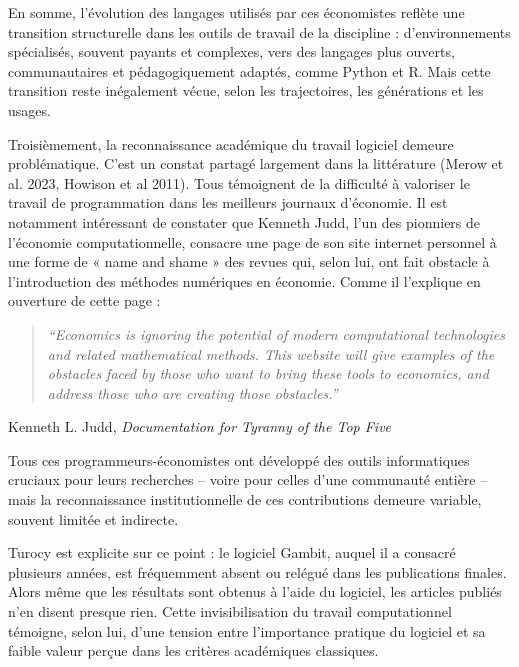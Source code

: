 En somme, l’évolution des langages utilisés par ces économistes reflète une transition structurelle dans les outils de travail de la discipline : d’environnements spécialisés, souvent payants et complexes, vers des langages plus ouverts, communautaires et pédagogiquement adaptés, comme Python et R. Mais cette transition reste inégalement vécue, selon les trajectoires, les générations et les usages.


Troisièmement, la reconnaissance académique du travail logiciel demeure problématique. C'est un constat partagé largement dans la littérature (Merow et al. 2023\cite{merowBetterIncentivesAre2023}, Howison et al 2011\cite{howisonScientificSoftwareProduction2011}). Tous témoignent de la difficulté à valoriser le travail de programmation dans les meilleurs journaux d'économie. Il est notamment intéressant de constater que Kenneth Judd, l’un des pionniers de l’économie computationnelle, consacre une page de son site internet personnel à une forme de « name and shame » des revues qui, selon lui, ont fait obstacle à l’introduction des méthodes numériques en économie\cite{DocumentationTyrannyTop}. Comme il l’explique en ouverture de cette page :
\begin{quote}
\begin{center}
\textit{``Economics is ignoring the potential of modern computational technologies and related mathematical methods. This website will give examples of the obstacles faced by those who want to bring these tools to economics, and address those who are creating those obstacles.''}
\end{center}
\end{quote} \hfill Kenneth L. Judd, \textit{Documentation for Tyranny of the Top Five}\cite{DocumentationTyrannyTop}

Tous ces programmeurs-économistes ont développé des outils informatiques cruciaux pour leurs recherches – voire pour celles d’une communauté entière – mais la reconnaissance institutionnelle de ces contributions demeure variable, souvent limitée et indirecte. 

Turocy est explicite sur ce point : le logiciel Gambit, auquel il a consacré plusieurs années, est fréquemment absent ou relégué dans les publications finales. Alors même que les résultats sont obtenus à l’aide du logiciel, les articles publiés n’en disent presque rien. Cette invisibilisation du travail computationnel témoigne, selon lui, d’une tension entre l’importance pratique du logiciel et sa faible valeur perçue dans les critères académiques classiques. 

